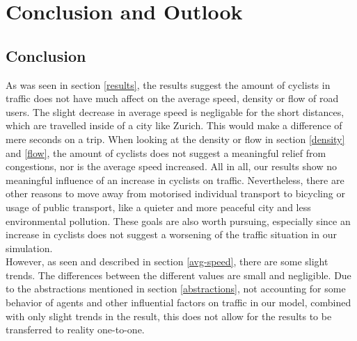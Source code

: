 \section{Conclusion and Outlook}
\subsection{Conclusion} \label{summary}
As was seen in section \ref{results}, the results suggest the amount of cyclists in traffic does not have much affect on the average speed, density or flow of road users. The slight decrease in average speed is negligable for the short distances, which are travelled inside of a city like Zurich. This would make a difference of mere seconds on a trip. When looking at the density or flow in section \ref{density} and \ref{flow}, the amount of cyclists  does not suggest a meaningful relief from congestions, nor is the average speed increased. All in all, our results show no meaningful influence of an increase in cyclists on traffic. Nevertheless, there are other reasons to move away from motorised individual transport to bicycling or usage of public transport, like a quieter and more peaceful city and less environmental pollution. These goals are also worth pursuing, especially since an increase in cyclists does not suggest a worsening of the traffic situation in our simulation.\\
However, as seen and described in section \ref{avg-speed}, there are some slight trends. The differences between the different values are small and negligible. Due to the abstractions mentioned in section \ref{abstractions}, not accounting for some behavior of agents and other influential factors on traffic in our model, combined with only slight trends in the result, this does not allow for the results to be transferred to reality one-to-one.\\

